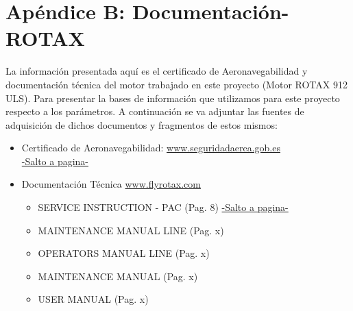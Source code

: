 \chapter{Apéndice B: Documentación-ROTAX}
    La información presentada aquí es el certificado de Aeronavegabilidad y documentación técnica del motor trabajado en este proyecto (Motor ROTAX 912 ULS). Para presentar la bases de información que utilizamos para este proyecto respecto a los parámetros. A continuación se va adjuntar las fuentes de adquisición de dichos documentos y fragmentos de estos mismos:
    
\begin{itemize}
    \item Certificado de Aeronavegabilidad: 
    \href{https://www.seguridadaerea.gob.es/sites/default/files/HD%20TC286-I%20r8.pdf}{www.seguridadaerea.gob.es} \\
        \hyperlink{certificado-aeronavegabilidad}{-Salto a pagina-} %
    
    \item Documentación Técnica 
        \href{https://www.flyrotax.com/p/service/technical-documentation}{www.flyrotax.com} \\

    \begin{itemize}
        \item SERVICE INSTRUCTION - PAC (Pag. 8) 
            \hyperlink{service-instruction-pag8}{-Salto a pagina-} %
    \end{itemize}

    \begin{itemize}
        \item MAINTENANCE MANUAL LINE (Pag. x)
    \end{itemize}

    \begin{itemize}
        \item OPERATORS MANUAL LINE (Pag. x)
    \end{itemize}

    \begin{itemize}
        \item MAINTENANCE MANUAL (Pag. x)
    \end{itemize}

    \begin{itemize}
        \item USER MANUAL (Pag. x)
    \end{itemize}
\end{itemize}

